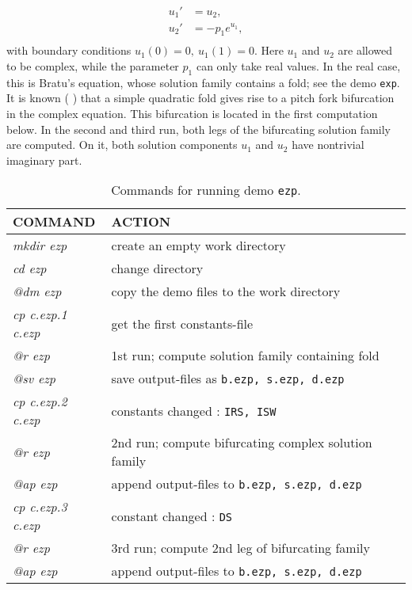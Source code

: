 \documentclass[12pt]{report}
\begin{document}
\begin{equation} \begin{array}{cl}
  u_1 ' &= u_2  ,  \\
  u_2 ' &= -p_1  e^{u_1} , \\
\end{array} \end{equation}
with boundary conditions $ u_1(0)=0 , ~u_1(1)=0.$
Here $u_1$ and $u_2$ are allowed to be complex, 
while the parameter $p_1$ can only take real values.
In the real case, this is Bratu's equation, whose solution family 
contains a fold; see the demo {\tt exp}.
It is known 
( \citeyear{HeKe:90}) that a simple quadratic fold gives rise to a pitch fork
bifurcation in the complex equation.
This bifurcation is located in the first computation below.
In the second and third run, both legs of the bifurcating solution family
are computed.
On it, both solution components $u_1$ and $u_2$ have nontrivial 
imaginary part.



\begin{table}[htbp]
\begin{center}
\begin{tabular}{| l | l |}
\hline
  COMMAND  & ACTION \\
\hline
  {\it mkdir ezp} & create an empty work directory \\ 
  {\it cd ezp} & change directory \\
  {\it @dm ezp} & copy the demo files to the work directory \\
\hline
  {\it cp c.ezp.1 c.ezp} & get the first constants-file \\ 
  {\it @r ezp} & 1st run; compute solution family containing fold \\ 
  {\it @sv ezp} & save output-files as {\tt b.ezp, s.ezp, d.ezp} \\ 
\hline
  {\it cp c.ezp.2 c.ezp} & constants changed : {\tt IRS, ISW} \\ 
  {\it @r ezp} & 2nd run; compute bifurcating complex solution family \\ 
  {\it @ap ezp} & append output-files to {\tt b.ezp, s.ezp, d.ezp} \\ 
\hline
  {\it cp c.ezp.3 c.ezp} & constant changed : {\tt DS} \\ 
  {\it @r ezp} & 3rd run; compute 2nd leg of bifurcating family \\ 
  {\it @ap ezp} & append output-files to {\tt b.ezp, s.ezp, d.ezp} \\
\hline
\end{tabular}
\caption{Commands for running demo {\tt ezp}.}
\label{tbl:demo_ezp}
\end{center}
\end{table}
\end{document}

